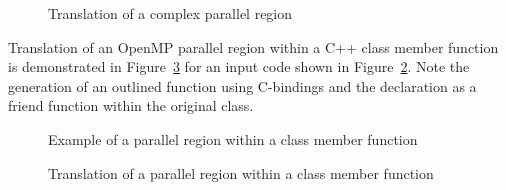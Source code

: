 \begin{figure}[htbp]
{\indent
  {\mySmallFontSize
    \begin{latexonly}
    
    \end{latexonly}
    \begin{htmlonly}
    
    \end{htmlonly}
  }
}
\caption{Translation of a complex parallel region}
\label{Manual:omp:preduction-trans}
\end{figure}

\clearpage
Translation of an OpenMP parallel region within a C++ class member function is demonstrated in
Figure~\ref{Manual:omp:classMember-trans} for an input code shown in
Figure~\ref{Manual:omp:classMember}. 
Note the generation of an outlined function using C-bindings and the
declaration as a friend function within the original class. 

\lstset{language=C,basicstyle=\scriptsize}
\begin{figure}[htbp]
{\indent
  {\mySmallFontSize
    \begin{latexonly}
    
    \end{latexonly}
    \begin{htmlonly}
    
    \end{htmlonly}
  }
}
\caption{Example of a parallel region within a class member function}
\label{Manual:omp:classMember}
\end{figure}

\begin{figure}[htbp]
{\indent
  {\mySmallFontSize
    \begin{latexonly}
    
    \end{latexonly}
    \begin{htmlonly}
    
    \end{htmlonly}
  }
}
\caption{Translation of a parallel region within a class member function}
\label{Manual:omp:classMember-trans}
\end{figure}


\clearpage
